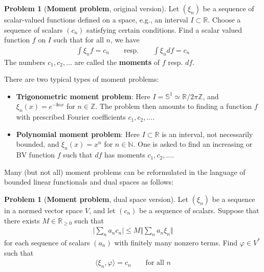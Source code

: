 \documentclass[12pt,b5paper,notitlepage]{article}
\theoremstyle{definition}
\newtheorem{problem}[df]{Problem}
\theoremstyle{plain}
\newcommand{\bk}[1]{\langle {#1}\rangle}
\newcommand{\im}{\mathbf{i}}
\newcommand{\Nbb}{\mathbb N}
\newcommand{\Zbb}{\mathbb Z}
\newcommand{\Rbb}{\mathbb R}
\newcommand{\Sbb}{{\mathbb S}}
\numberwithin{equation}{section}
\begin{document}
\begin{problem}[\textbf{Moment problem}, original version]\label{lb16}
Let $(\xi_n)$ be a sequence of scalar-valued functions defined on a space, e.g., an interval $I\subset\Rbb$. Choose a sequence of scalars $(c_n)$ satisfying certain conditions. Find a scalar valued function $f$ on $I$ such that for all $n$, we have
\begin{align}\label{eq10}
\int \xi_n f=c_n\qquad\text{resp.}\qquad \int \xi_ndf=c_n
\end{align} 
The numbers $c_1,c_2,\dots$ are called the \textbf{moments} of $f$ resp. $df$. 
\end{problem}



There are two typical types of moment problems:
\begin{itemize}
\item \textbf{Trigonometric moment problem}: Here $I=\Sbb^1\simeq\Rbb/2\pi\Zbb$, and $\xi_n(x)=e^{-\im nx}$ for $n\in\Zbb$. The problem then amounts to finding a function $f$ with prescribed Fourier coefficients $c_1,c_2,\dots$.
\item \textbf{Polynomial moment problem}: Here $I\subset\Rbb$ is an interval, not necessarily bounded, and $\xi_n(x)=x^n$ for $n\in\Nbb$. One is asked to find an increasing or BV function $f$ such that $df$ has moments $c_1,c_2,\dots$.
\end{itemize}


Many (but not all) moment problems can be reformulated in the language of bounded linear functionals and dual spaces as follows:

\begin{problem}[\textbf{Moment problem}, dual space version]\label{lb17}
Let $(\xi_n)$ be a sequence in a normed vector space $V$, and let  $(c_n)$ be a sequence of scalars. Suppose that there exists $M\in\Rbb_{\geq0}$ such that
\begin{align}\label{eq3}
\Big|\sum_n a_nc_n\Big|\leq M\Big \Vert\sum_n a_n\xi_n\Big\Vert 
\end{align}
for each sequence of scalars $(a_n)$ with finitely many nonzero terms. Find $\varphi\in V^*$ such that
\begin{align}\label{eq4}
\bk{\xi_n,\varphi}=c_n\qquad\text{for all }n
\end{align}
\end{problem}
\end{document}
